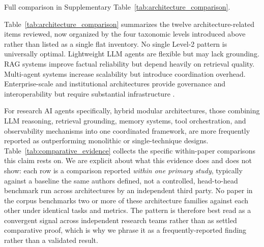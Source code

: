 \documentclass[sn-basic,Numbered]{sn-jnl}
\begin{document}
Full comparison in Supplementary Table~\ref{tab:architecture_comparison}.

Table~\ref{tab:architecture_comparison} summarizes the twelve
architecture-related items reviewed, now organized by the four
taxonomic levels introduced above rather than listed as a single flat
inventory. No single Level-2 pattern is universally optimal.
Lightweight LLM agents are flexible but may lack grounding.
RAG systems improve factual reliability but depend heavily on retrieval
quality. Multi-agent systems increase scalability but introduce
coordination overhead. Enterprise-scale and institutional architectures
provide governance and interoperability but require substantial
infrastructure \cite{pandey2025agenticenterprise,ivanova2025libraryai}.

For research AI agents specifically, hybrid modular architectures,
those combining LLM reasoning, retrieval grounding, memory systems,
tool orchestration, and observability mechanisms into one coordinated
framework, are more frequently reported as outperforming monolithic or
single-technique designs. Table~\ref{tab:comparative_evidence}
collects the specific within-paper comparisons this claim rests on. We
are explicit about what this evidence does and does not show: each row
is a comparison reported \emph{within one primary study}, typically
against a baseline the same authors defined, not a controlled,
head-to-head benchmark run across architectures by an independent
third party. No paper in the corpus benchmarks two or more of these
architecture families against each other under identical tasks and
metrics. The pattern is therefore best read as a convergent signal
across independent research teams rather than as settled comparative
proof, which is why we phrase it as a frequently-reported finding
rather than a validated result.
\end{document}
